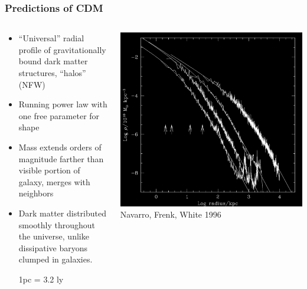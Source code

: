 \documentclass{beamer}
\begin{document}
\frame
{
    \frametitle{Predictions of CDM}

    \fontsize{9}{0.8\baselineskip}
    \begin{columns}
        \begin{column}{0.5\textwidth}    
            \begin{itemize}

                \item  ``Universal'' radial profile of gravitationally bound dark matter
                    structures, ``halos'' {\color{gold} (NFW)}

                        \item Running power law with one free parameter for shape

                        \item Mass extends orders of magnitude farther than visible portion of galaxy,
                            merges with neighbors

                \item  Dark matter distributed smoothly throughout the
                    universe, unlike dissipative baryons clumped in galaxies.

                {\tiny 1pc = 3.2 ly}

            \end{itemize}
        \end{column}
        \begin{column}{0.5\textwidth}
            \begin{center}
                \includegraphics[width=\textwidth]{nfw.png}
                \newline
                {\tiny Navarro, Frenk, White 1996}
            \end{center}
        \end{column}
    \end{columns}
}
\end{document}
